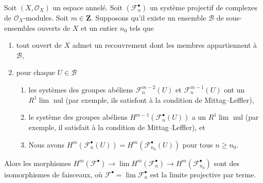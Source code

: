 \begin{lemma}

\label{lemma-inverse-limit-complexes}

Soit $(X, \mathcal{O}_X)$ un espace annelé. Soit $(\mathcal{F}_n^\bullet)$
un système projectif de complexes de $\mathcal{O}_X$-modules. Soit $m \in \mathbf{Z}$. Supposons qu'il existe un ensemble $\mathcal{B}$ de sous-ensembles ouverts de $X$ et un entier $n_0$ tels que

\begin{enumerate}

\item tout ouvert de $X$ admet un recouvrement dont les membres appartiennent à $\mathcal{B}$,
\item pour chaque $U \in \mathcal{B}$

\begin{enumerate}

\item les systèmes des groupes abéliens
$\mathcal{F}_n^{m - 2}(U)$ et $\mathcal{F}_n^{m - 1}(U)$
ont un $R^1\lim$ nul (par exemple, ils satisfont à la condition de Mittag--Leffler),
\item le système des groupes abéliens $H^{m - 1}(\mathcal{F}_n^\bullet(U))$
a un $R^1\lim$ nul (par exemple, il satisfait à la condition de Mittag--Leffler), et
\item Nous avons
$H^m(\mathcal{F}_n^\bullet(U)) = H^m(\mathcal{F}_{n_0}^\bullet(U))$
pour tous $n \geq n_0$.

\end{enumerate}

\end{enumerate}

Alors les morphismes
$H^m(\mathcal{F}^\bullet) \to \lim H^m(\mathcal{F}_n^\bullet) \to
H^m(\mathcal{F}_{n_0}^\bullet)$
sont des isomorphismes de faisceaux, où
$\mathcal{F}^\bullet = \lim \mathcal{F}_n^\bullet$ est la limite projective par terme.

\end{lemma}

